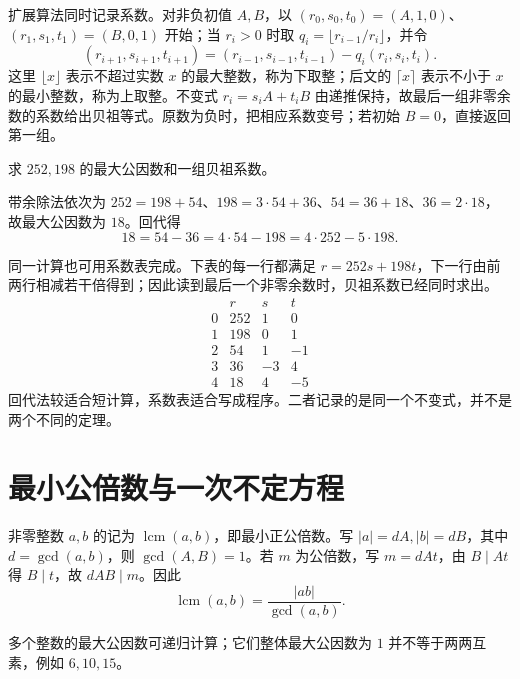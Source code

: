 \documentclass[UTF8,12pt,a4paper,fontset=fandol]{ctexbook}
\begin{document}
扩展算法同时记录系数。对非负初值 $A,B$，以 $(r_0,s_0,t_0)=(A,1,0)$、$(r_1,s_1,t_1)=(B,0,1)$ 开始；当 $r_i>0$ 时取 $q_i=\lfloor r_{i-1}/r_i\rfloor$，并令
\[
 (r_{i+1},s_{i+1},t_{i+1})
 =(r_{i-1},s_{i-1},t_{i-1})-q_i(r_i,s_i,t_i).
\]
这里 $\lfloor x\rfloor$ 表示不超过实数 $x$ 的最大整数，称为下取整；后文的 $\lceil x\rceil$ 表示不小于 $x$ 的最小整数，称为上取整。不变式 $r_i=s_iA+t_iB$ 由递推保持，故最后一组非零余数的系数给出贝祖等式。原数为负时，把相应系数变号；若初始 $B=0$，直接返回第一组。

\begin{example}
求 $252,198$ 的最大公因数和一组贝祖系数。
\end{example}
\begin{solve}
带余除法依次为 $252=198+54$、$198=3\cdot54+36$、$54=36+18$、$36=2\cdot18$，故最大公因数为 $18$。回代得
\[
 18=54-36=4\cdot54-198=4\cdot252-5\cdot198.
\]
\end{solve}

同一计算也可用系数表完成。下表的每一行都满足 $r=252s+198t$，下一行由前两行相减若干倍得到；因此读到最后一个非零余数时，贝祖系数已经同时求出。
\[
\begin{array}{c|r|r|r}
 &r&s&t\\\hline
0&252&1&0\\
1&198&0&1\\
2&54&1&-1\\
3&36&-3&4\\
4&18&4&-5
\end{array}
\]
回代法较适合短计算，系数表适合写成程序。二者记录的是同一个不变式，并不是两个不同的定理。

\section{最小公倍数与一次不定方程}

非零整数 $a,b$ 的记为 $\operatorname{lcm}(a,b)$，即最小正公倍数。写 $|a|=dA,|b|=dB$，其中 $d=\gcd(a,b)$，则 $\gcd(A,B)=1$。若 $m$ 为公倍数，写 $m=dAt$，由 $B\mid At$ 得 $B\mid t$，故 $dAB\mid m$。因此
\begin{equation}
 \operatorname{lcm}(a,b)=\frac{|ab|}{\gcd(a,b)}.
 \label{eq:gcd-lcm}
\end{equation}

多个整数的最大公因数可递归计算；它们整体最大公因数为 $1$ 并不等于两两互素，例如 $6,10,15$。
\end{document}
